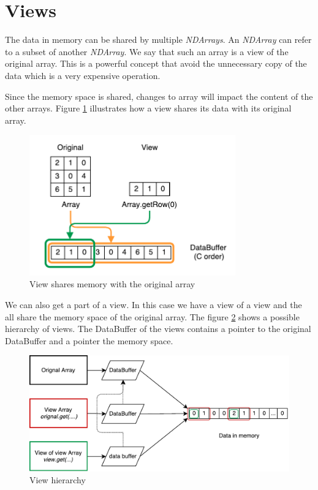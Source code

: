 \section{Views}
\label{sec:viewsDesc}
The data in memory can be shared by multiple \textit{NDArrays}. An \textit{NDArray} can refer to a subset of another \textit{NDArray}. We say that such an array is a view of the original array. This is a powerful concept that avoid the unnecessary copy of the data which is a very expensive operation.

Since the memory space is shared, changes to array will impact the content of the other arrays. Figure \ref{fig:sharememView} illustrates how a view shares its data with its original array.


\begin{figure}[!h]
	\begin{center}
		\includegraphics[width=3.5in]{images/views.pdf} 
		\caption{View shares memory with the original array}		
		\label{fig:sharememView}
	\end{center}
\end{figure}


We can also get a part of a view. In this case we have a view of a view and the all share the memory space of the original array. The figure \ref{fig:hierachyview} shows a possible hierarchy of views. The DataBuffer of the views contains a pointer to the original DataBuffer and a pointer the memory space.


\begin{figure}[h]
	\begin{center}
		\includegraphics[width=5.5in]{images/hierarchyview.pdf} 
		\caption{View hierarchy}
		\label{fig:hierachyview}
	\end{center}
\end{figure}


